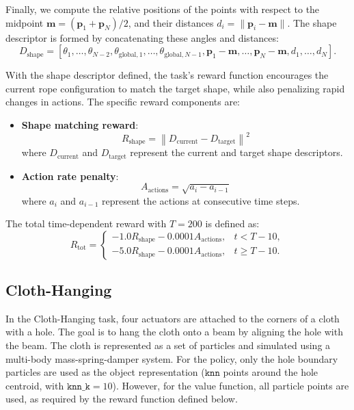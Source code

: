 Finally, we compute the relative positions of the points with respect to the midpoint $\mathbf{m} = (\mathbf{p}_1 + \mathbf{p}_N) / 2$, and their distances $d_i = \|\mathbf{p}_i - \mathbf{m}\|$. The shape descriptor is formed by concatenating these angles and distances: 
\begin{equation*}
    D_\text{shape} = [\theta_1, \dots, \theta_{N-2}, \theta_{\text{global}, 1}, \dots, \theta_{\text{global}, N-1}, \mathbf{p}_1 - \mathbf{m}, \dots, \mathbf{p}_N - \mathbf{m}, d_1, \dots, d_N].
\end{equation*}

With the shape descriptor defined, the task's reward function encourages the current rope configuration to match the target shape, while also penalizing rapid changes in actions. The specific reward components are:
\begin{itemize}
    \item \textbf{Shape matching reward}:
    \[
    R_\text{shape} = \left\| D_\text{current} - D_\text{target} \right\|^2
    \]
    where $D_\text{current}$ and $D_\text{target}$ represent the current and target shape descriptors.
    \item \textbf{Action rate penalty}:
    \[
    A_{\text{actions}} = \sqrt{a_{i} - a_{i-1}}
    \]
    where $a_i$ and $a_{i-1}$ represent the actions at consecutive time steps.
\end{itemize}

The total time-dependent reward with $T=200$ is defined as:
\[
R_\text{tot} = \begin{cases}
    - 1.0 R_\text{shape} - 0.0001 A_{\text{actions}}, & t < T-10, \\
    - 5.0 R_\text{shape} - 0.0001 A_{\text{actions}}, & t \geq T-10.
\end{cases}
\]


\subsection{Cloth-Hanging}
In the Cloth-Hanging task, four actuators are attached to the corners of a cloth with a hole. The goal is to hang the cloth onto a beam by aligning the hole with the beam. The cloth is represented as a set of particles and simulated using a multi-body mass-spring-damper system. For the policy, only the hole boundary particles are used as the object representation ($\texttt{knn}$ points around the hole centroid, with $\texttt{knn\_k} = 10$). However, for the value function, all particle points are used, as required by the reward function defined below.


